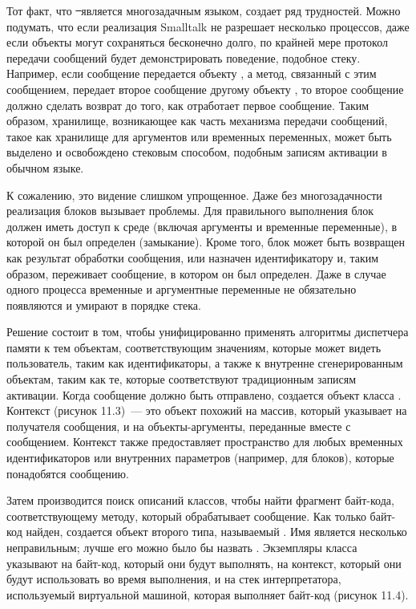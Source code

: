 
Тот факт, что \st\ является многозадачным языком, создает ряд трудностей.
Можно подумать, что если реализация Smalltalk не разрешает несколько процессов,
даже если объекты могут сохраняться бесконечно долго, по крайней мере протокол
передачи сообщений будет демонстрировать поведение, подобное стеку. Например,
если сообщение  передается объекту , а метод, связанный с этим
сообщением, передает второе сообщение  другому объекту , то
второе сообщение должно сделать возврат до того, как отработает первое
сообщение. Таким образом, хранилище, возникающее как часть механизма передачи
сообщений, такое как хранилище для аргументов или временных переменных, может
быть выделено и освобождено стековым способом, подобным записям активации в
обычном языке.

К сожалению, это видение слишком упрощенное. Даже без многозадачности реализация
блоков вызывает проблемы. Для правильного выполнения блок должен иметь доступ к
среде (включая аргументы и временные переменные), в которой он был определен
(замыкание). Кроме того, блок может быть возвращен как результат обработки
сообщения, или назначен идентификатору и, таким образом, переживает сообщение, в
котором он был определен. Даже в случае одного процесса временные и аргументные
переменные не обязательно появляются и умирают в порядке стека.

Решение состоит в том, чтобы унифицированно применять алгоритмы диспетчера
памяти к тем объектам, соответствующим значениям, которые может видеть
пользователь, таким как идентификаторы, а также к внутренне сгенерированным
объектам, таким как те, которые соответствуют традиционным записям активации.
Когда сообщение должно быть отправлено, создается объект класса .
Контекст (рисунок 11.3)\ --- это объект похожий на массив, который указывает на
получателя сообщения, и на объекты-аргументы, переданные вместе с сообщением.
Контекст также предоставляет пространство для любых временных идентификаторов
или внутренних параметров (например, для блоков), которые понадобятся сообщению.


Затем производится поиск описаний классов, чтобы найти фрагмент байт-кода,
соответствующему методу, который обрабатывает сообщение. Как только байт-код
найден, создается объект второго типа, называемый . Имя
 является несколько неправильным; лучше его можно было бы
назвать . Экземпляры класса
 указывают на байт-код, который они будут выполнять, на
контекст, который они будут использовать во время выполнения, и на стек
интерпретатора, используемый виртуальной машиной, которая выполняет байт-код
(рисунок 11.4).

